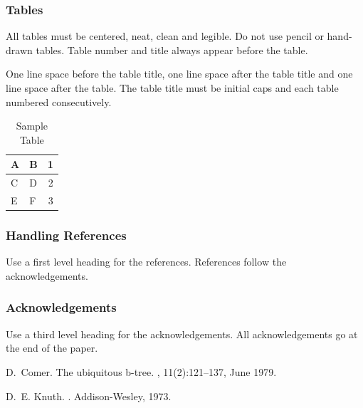 \documentclass[a4paper]{article}
\begin{document}
\subsubsection{Tables}

All tables must be centered, neat, clean and legible. Do not use pencil
or hand-drawn tables. Table number and title always appear before the
table.

One line space before the table title, one line space after the table
title and one line space after the table. The table title must be
initial caps and each table numbered consecutively.

\begin{table}[ht]
\begin{center}
\caption{Sample Table}

\bigskip

\begin{tabular}{|l|l|r|}
\hline
A & B & 1\\ \hline
C & D & 2\\
E & F & 3\\ \hline
\end{tabular}
\end{center}
\end{table}


\subsubsection{Handling References}

Use a first level heading for the references. References follow the
acknowledgements.


\subsubsection{Acknowledgements}

Use a third level heading for the acknowledgements. All acknowledgements
go at the end of the paper.




% 
%

\begin{thebibliography}{Com79}

D.~Comer.
\newblock The ubiquitous b-tree.
, 11(2):121--137, June 1979.

D.~E. Knuth.
.
\newblock Addison-Wesley, 1973.

\end{thebibliography}
\end{document}
